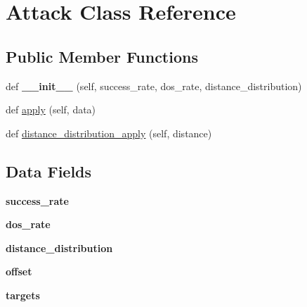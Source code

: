 \hypertarget{class_attacks_1_1_attack}{}\section{Attack Class Reference}
\label{class_attacks_1_1_attack}
\subsection*{Public Member Functions}
\begin{DoxyCompactItemize}
\item 
\mbox{\label{class_attacks_1_1_attack_ac7e11b0c699f3512b8b1ae903ba3944c}} 
def {\bfseries \+\_\+\+\_\+init\+\_\+\+\_\+} (self, success\+\_\+rate, dos\+\_\+rate, distance\+\_\+distribution)
\item 
def \mbox{\hyperlink{class_attacks_1_1_attack_ab16da2c66772b1363a9db1e338f1e445}{apply}} (self, data)
\item 
def \mbox{\hyperlink{class_attacks_1_1_attack_a648687d12cef0a0d27e179d15311187d}{distance\+\_\+distribution\+\_\+apply}} (self, distance)
\end{DoxyCompactItemize}
\subsection*{Data Fields}
\begin{DoxyCompactItemize}
\item 
\mbox{\label{class_attacks_1_1_attack_a7c855ec6d163e10846e723e0d5d96fce}} 
{\bfseries success\+\_\+rate}
\item 
\mbox{\label{class_attacks_1_1_attack_a2ab94bd38ebfc77d36946b4e6007ecfa}} 
{\bfseries dos\+\_\+rate}
\item 
\mbox{\label{class_attacks_1_1_attack_a590a35947be7c58e794475226eba6178}} 
{\bfseries distance\+\_\+distribution}
\item 
\mbox{\label{class_attacks_1_1_attack_a7a229a4786deeddd59c6091247a8c8a6}} 
{\bfseries offset}
\item 
\mbox{\label{class_attacks_1_1_attack_aca9a7ee02fb8663e9e2971ca4052b0c6}} 
{\bfseries targets}
\end{DoxyCompactItemize}


